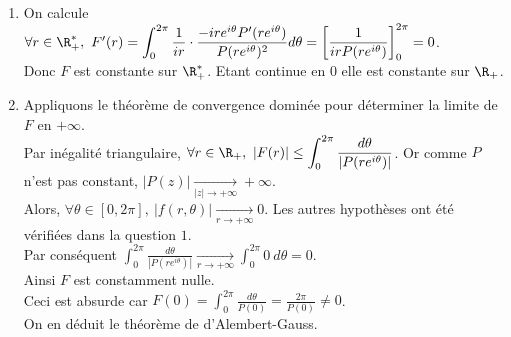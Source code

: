 \documentclass{book}
\begin{document}
\begin{enumerate}[leftmargin=*]
		\item On calcule $\forall r\in \R^*_+,\ F'(r)=\displaystyle\int_0^{2\pi}\frac{1}{ir}\cdot\frac{-ire^{i\theta}P'(re^{i\theta})}{P(re^{i\theta})^2}d\theta=\left[\frac{1}{irP(re^{i\theta})}\right]_0^{2\pi}=0$.\\
		Donc $F$ est constante sur $\R^*_+$. Etant continue en $0$ elle est constante sur $\R_+$.
		\item Appliquons le théorème de convergence dominée pour déterminer la limite de $F$ en $+\infty$.\\
		Par inégalité triangulaire, $\forall r\in \R_+,\ |F(r)|\leq \displaystyle\int_0^{2\pi}\frac{d\theta}{|P(re^{i\theta})|}$. Or comme $P$ n'est pas constant, $|P(z)|\underset{|z|\to +\infty}{\longrightarrow}+\infty$.\\
		Alors, $\forall \theta\in [0,2\pi],\ |f(r,\theta)|\underset{r\to +\infty}{\longrightarrow}0$. Les autres hypothèses ont été vérifiées dans la question $1$.\\
		Par conséquent $\displaystyle\int_0^{2\pi}\frac{d\theta}{|P(re^{i\theta})|}\underset{r\to +\infty}{\longrightarrow}\int_0^{2\pi}0\ d\theta=0$.\\
		Ainsi $F$ est constamment nulle.\\
		Ceci est absurde car $F(0)=\displaystyle\int_0^{2\pi}\frac{d\theta}{P(0)}=\frac{2\pi}{P(0)}\ne 0$.\\
		On en déduit le théorème de d'Alembert-Gauss.
	\end{enumerate}
\end{document}
